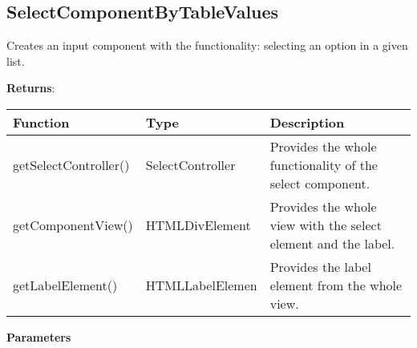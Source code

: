 \clearpage
\subsection*{SelectComponentByTableValues}

\vspace*{6pt}
Creates an input component with the functionality: selecting an option in a given list. 

\vspace*{18pt}
\noindent
\textbf{Returns}: 

\begin{table}[!htb] 
    \label{api:selectComponentByTableValuesReturn}
    \footnotesize
    \setlength\extrarowheight{4pt}
    \begin{tabular}{ p{3.5cm} p{3.5cm} p{5.5cm} }
        \toprule[1.2pt]
        \textbf{Function}     & \textbf{Type}    & \textbf{Description} \\
        \midrule
        getSelectController() & SelectController & Provides the whole functionality of the select component. \\
        getComponentView()    & HTMLDivElement   & Provides the whole view with the select element and the label. \\
        getLabelElement()     & HTMLLabelElemen  & Provides the label element from the whole view. \\
        \bottomrule[1.2pt]
    \end{tabular}
\end{table}

\vspace*{6pt}
\noindent
\textbf{Parameters}

